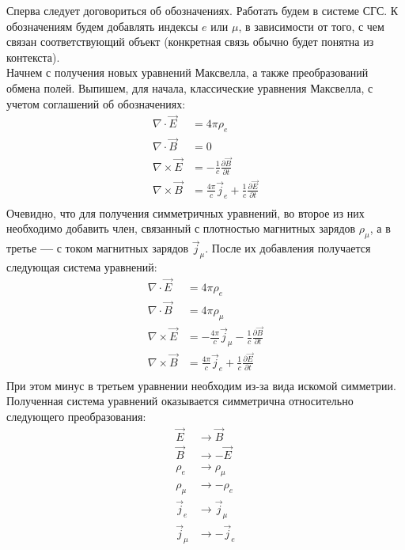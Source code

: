 \documentclass[oneside,final,14pt]{extarticle}
\begin{document}
	\noindent Сперва следует договориться об обозначениях. Работать будем в системе СГС. К обозначениям будем добавлять индексы $e$ или $\mu$, в зависимости от того, с чем связан соответствующий объект (конкретная связь обычно будет понятна из контекста). \\
	
	\noindent Начнем с получения новых уравнений Максвелла, а также преобразований обмена полей. Выпишем, для начала, классические уравнения Максвелла, с учетом соглашений об обозначениях: 
	$$
	\begin{aligned} 
		\nabla \cdot \vec E & = 4\pi\rho_{e} \\
		\nabla \cdot \vec B & = 0 \\
		\nabla \times \vec E & = -\frac{1}{c}\frac{\partial \vec B}{\partial t} \\
		\nabla \times \vec B & = \frac{4\pi}{c}\vec j_{e}+\frac{1}{c}\frac{\partial \vec E}{\partial t} \\
	\end{aligned}
	$$
	Очевидно, что для получения симметричных уравнений, во второе из них необходимо добавить член, связанный с плотностью магнитных зарядов $\rho_{\mu}$, а в третье \textbf{---} с током магнитных зарядов $\vec j_{\mu}$. После их добавления получается следующая система уравнений:
	$$
	\begin{aligned} 
		\nabla \cdot \vec E & = 4\pi\rho_{e} \\
		\nabla \cdot \vec B & =4\pi\rho_{\mu} \\
		\nabla \times \vec E & = -\frac{4\pi}{c}\vec j_{\mu}-\frac{1}{c}\frac{\partial \vec B}{\partial t} \\
		\nabla \times \vec B & = \frac{4\pi}{c}\vec j_{e}+\frac{1}{c}\frac{\partial \vec E}{\partial t} \\
	\end{aligned}
	$$
	При этом минус в третьем уравнении необходим из-за вида искомой симметрии. Полученная система уравнений оказывается симметрична относительно следующего преобразования:
	$$
	\begin{aligned} 
		\vec E & \rightarrow \vec B \\
		\vec B & \rightarrow -\vec E \\
		\rho_{e} & \rightarrow \rho_{\mu} \\
		\rho_{\mu} & \rightarrow -\rho_{e} \\
		\vec j_{e} & \rightarrow \vec j_{\mu} \\
		\vec j_{\mu} & \rightarrow -\vec j_{e} \\
	\end{aligned}
	$$
\end{document}
